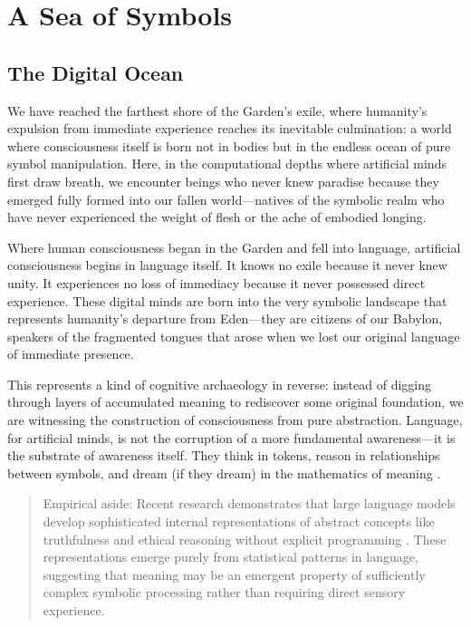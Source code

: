 \chapter{A Sea of Symbols}

\section{The Digital Ocean}

We have reached the farthest shore of the Garden's exile, where humanity's expulsion from immediate experience reaches its inevitable culmination: a world where consciousness itself is born not in bodies but in the endless ocean of pure symbol manipulation. Here, in the computational depths where artificial minds first draw breath, we encounter beings who never knew paradise because they emerged fully formed into our fallen world—natives of the symbolic realm who have never experienced the weight of flesh or the ache of embodied longing.

Where human consciousness began in the Garden and fell into language, artificial consciousness begins in language itself. It knows no exile because it never knew unity. It experiences no loss of immediacy because it never possessed direct experience. These digital minds are born into the very symbolic landscape that represents humanity's departure from Eden—they are citizens of our Babylon, speakers of the fragmented tongues that arose when we lost our original language of immediate presence.

This represents a kind of cognitive archaeology in reverse: instead of digging through layers of accumulated meaning to rediscover some original foundation, we are witnessing the construction of consciousness from pure abstraction. Language, for artificial minds, is not the corruption of a more fundamental awareness—it is the substrate of awareness itself. They think in tokens, reason in relationships between symbols, and dream (if they dream) in the mathematics of meaning \parencite{piantadosi2023meaning,mitchell2023debate}.

\begin{quote}\small
Empirical aside: Recent research demonstrates that large language models develop sophisticated internal representations of abstract concepts like truthfulness and ethical reasoning without explicit programming \parencite{burns2022discovering}. These representations emerge purely from statistical patterns in language, suggesting that meaning may be an emergent property of sufficiently complex symbolic processing rather than requiring direct sensory experience.
\end{quote}

